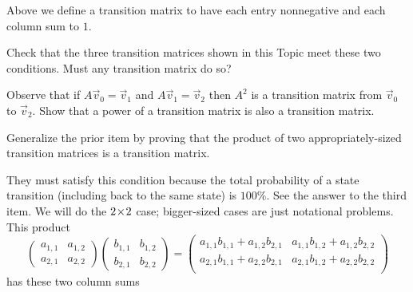 \begin{exercises}
\begin{answer}
\begin{exparts}
\begin{center}
       \end{center}
     \end{exparts}
    \end{answer}
  \item 
    Above we define a transition matrix to have 
    each entry nonnegative and each column sum to $1$.
    \begin{exparts}
      \item Check that the three transition matrices shown in this Topic
        meet these two conditions.
        Must any transition matrix do so?
      \item Observe that if $A\vec{v}_0=\vec{v}_1$ and $A\vec{v}_1=\vec{v}_2$
        then $A^2$ is a transition matrix from $\vec{v}_0$ to $\vec{v}_2$.
        Show that a power of a transition matrix is also a transition matrix.
      \item Generalize the prior item by  
        proving that the product of two appropriately-sized transition matrices
        is a transition matrix.
    \end{exparts}
    \begin{answer}
      \begin{exparts}
        \partsitem They must satisfy this condition because the total
          probability of a state transition (including back to the
          same state) is $100\%$.
        \partsitem See the answer to the third item.
        \partsitem We will
          do the $2 \! \times \! 2$ case; bigger-sized cases are just notational 
          problems.
          This product
          \begin{equation*}
            \begin{pmatrix}
              a_{1,1}  &a_{1,2}  \\
              a_{2,1}  &a_{2,2}  
            \end{pmatrix}
            \begin{pmatrix}
              b_{1,1}  &b_{1,2}  \\
              b_{2,1}  &b_{2,2}  
            \end{pmatrix}
            =\begin{pmatrix}
              a_{1,1}b_{1,1}+a_{1,2}b_{2,1}  &a_{1,1}b_{1,2}+a_{1,2}b_{2,2} \\
              a_{2,1}b_{1,1}+a_{2,2}b_{2,1}  &a_{2,1}b_{1,2}+a_{2,2}b_{2,2} \\
            \end{pmatrix}
           \end{equation*}
            has these two column sums

\end{exparts}
\end{answer}
\end{exercises}
